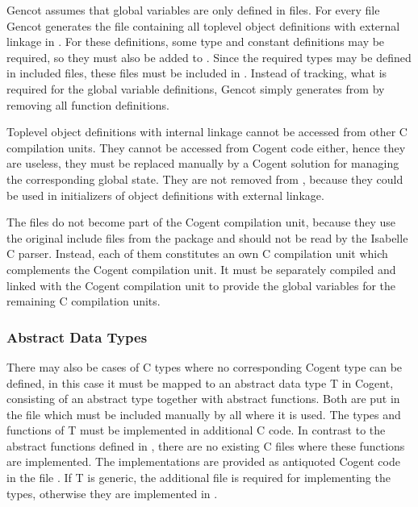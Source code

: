 Gencot assumes that global variables are only defined in  files. For every file  Gencot generates
the file  containing all toplevel object definitions with external linkage in . For 
these definitions, some type and constant definitions may be required, so they must also be added to .
Since the required types may be defined in included  files, these files must be included in .
Instead of tracking, what is required for the global variable definitions, Gencot simply generates 
from  by removing all function definitions. 

Toplevel object definitions with internal linkage cannot be accessed from other C compilation units. They cannot be
accessed from Cogent code either, hence they are useless, they must be replaced manually by a Cogent solution for
managing the corresponding global state. They are not removed from , because they could be used in
initializers of object definitions with external linkage.

The files  do not become part of the Cogent compilation unit, because they use the original 
include files from the package and should not be read by the Isabelle C parser. Instead, each of them constitutes 
an own C compilation unit which complements the Cogent compilation unit. It must be separately compiled and
linked with the Cogent compilation unit to provide the global variables for the remaining C compilation units.

\subsubsection{Abstract Data Types}

There may also be cases of C types where no corresponding Cogent type can be defined, in this case it must be mapped to an 
abstract data type T in Cogent, consisting of an abstract type together with abstract functions. Both are put in 
the file  which must be included manually by all  where it is used. The types and 
functions of T must be implemented in additional C code. In contrast to the abstract functions defined in 
,
there are no existing C files where these functions are implemented. The implementations are provided as antiquoted Cogent 
code in the file . If T is generic, the additional file  is required for 
implementing the types, otherwise they are implemented in . 

